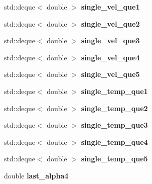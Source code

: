 \begin{DoxyCompactItemize}
\item 
\mbox{\label{classarmcontroller_a874e5713e57b27d8bd2411a8489f7866}} 
std\+::deque$<$ double $>$ {\bfseries single\+\_\+vel\+\_\+que1}
\item 
\mbox{\label{classarmcontroller_a81cbec8fd65f32026d45d39261c0dda2}} 
std\+::deque$<$ double $>$ {\bfseries single\+\_\+vel\+\_\+que2}
\item 
\mbox{\label{classarmcontroller_aec26a722458e61e1d19bb2792727ba76}} 
std\+::deque$<$ double $>$ {\bfseries single\+\_\+vel\+\_\+que3}
\item 
\mbox{\label{classarmcontroller_af9ea47e211011bd1b1e0d99d98073e58}} 
std\+::deque$<$ double $>$ {\bfseries single\+\_\+vel\+\_\+que4}
\item 
\mbox{\label{classarmcontroller_aa15c4f2ae51f44ca935c3625211155e9}} 
std\+::deque$<$ double $>$ {\bfseries single\+\_\+vel\+\_\+que5}
\item 
\mbox{\label{classarmcontroller_acfb8b7af9f3b36d81b3a94559c6a2e28}} 
std\+::deque$<$ double $>$ {\bfseries single\+\_\+temp\+\_\+que1}
\item 
\mbox{\label{classarmcontroller_af2ade00ba55165258195ea263150cdf4}} 
std\+::deque$<$ double $>$ {\bfseries single\+\_\+temp\+\_\+que2}
\item 
\mbox{\label{classarmcontroller_a0b0fa6095474fdfd30742967f04c5825}} 
std\+::deque$<$ double $>$ {\bfseries single\+\_\+temp\+\_\+que3}
\item 
\mbox{\label{classarmcontroller_aad87315185a3143531b44fc88ea36bb7}} 
std\+::deque$<$ double $>$ {\bfseries single\+\_\+temp\+\_\+que4}
\item 
\mbox{\label{classarmcontroller_a02fb1470c7f547094592fa8589d96f82}} 
std\+::deque$<$ double $>$ {\bfseries single\+\_\+temp\+\_\+que5}
\item 
\mbox{\label{classarmcontroller_a98c171b07686d075da4c32b27e0920bd}} 
double {\bfseries last\+\_\+alpha4}
\end{DoxyCompactItemize}



